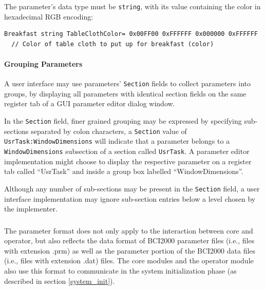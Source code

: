 \documentclass[letterpaper,oneside,12pt]{book}
\begin{document}
The parameter's data type must be \texttt{string}, with its value containing the color
in hexadecimal RGB encoding:
\begin{verbatim}
Breakfast string TableClothColor= 0x00FF00 0xFFFFFF 0x000000 0xFFFFFF
  // Color of table cloth to put up for breakfast (color)
\end{verbatim}

\paragraph{Grouping Parameters}
A user interface may use parameters' \texttt{Section} fields to collect parameters into
groups, \eg{} by displaying all parameters with identical section fields on the same
register tab of a GUI parameter editor dialog window.

In the \texttt{Section} field, finer grained grouping may be expressed by specifying
sub-sections separated by colon characters, \eg{} a \texttt{Section} value of
\verb|UsrTask:WindowDimensions|
will indicate that a parameter belongs to a \texttt{WindowDimensions} subsection of
a section called \texttt{UsrTask}. A parameter editor implementation might 
choose to display the respective parameter on a register tab called ``UsrTask'' and
inside a group box labelled ``WindowDimensions''.

Although any number of sub-sections may be present in the \texttt{Section} field, 
a user interface implementation may ignore sub-section entries below a 
level chosen by the implementer.

\subsubsection{}
The parameter format does not only apply to the interaction between core and 
operator, but also reflects the data format of BCI2000 parameter files (i.e., 
files with extension .prm) as well as the parameter portion of the BCI2000 data 
files (i.e., files with extension .dat) files. The core modules and the operator 
module also use this format to communicate in the system initialization phase 
(as described in section \ref{system_init}).
\end{document}
